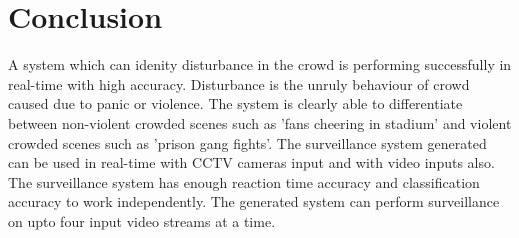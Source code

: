 \chapter{Conclusion}

A system which can idenity disturbance in the crowd is performing successfully in real-time with high accuracy. Disturbance is the unruly behaviour of crowd caused due to panic or violence. The system is clearly able to differentiate between non-violent crowded scenes such as 'fans cheering in stadium' and violent crowded scenes such as 'prison gang fights'. The surveillance system generated can be used in real-time with CCTV cameras input and with video inputs also. The surveillance system has enough reaction time accuracy and classification accuracy to work independently. The generated system can perform surveillance on upto four input video streams at a time.
